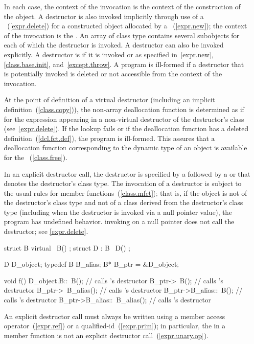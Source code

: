 %
%
In each case, the context of the invocation is the context of the construction of
the object. A destructor is also invoked implicitly through use of a
~(\ref{expr.delete}) for a constructed object allocated
by a ~(\ref{expr.new}); the context of the invocation is the
.
\enternote An array of class type contains several subobjects for each of which
the destructor is invoked. \exitnote
A destructor can also be invoked explicitly. A destructor is 
if it is invoked or as specified in~\ref{expr.new}, \ref{class.base.init},
and~\ref{except.throw}.
A program is ill-formed if a destructor that is potentially invoked is deleted
or not accessible from the context of the invocation.

\pnum
At the point of definition of a virtual destructor (including an implicit
definition~(\ref{class.copy})), the non-array deallocation function is 
determined as if for the expression  appearing in a
non-virtual destructor of the destructor's class (see~\ref{expr.delete}).
If the lookup fails or if the deallocation function has
a deleted definition~(\ref{dcl.fct.def}), the program is ill-formed.
\enternote
This assures that a deallocation function corresponding to the dynamic type of an
object is available for the
~(\ref{class.free}).
\exitnote

\pnum
{}%
In an explicit destructor call, the destructor is specified by a
\tcode{\~{}}
followed by a
 or 
that denotes the destructor's class type.
The invocation of a destructor is subject to the usual rules for member
functions~(\ref{class.mfct});
that is, if the object is not of the destructor's class type and
not of a class derived from the destructor's class type (including when
the destructor is invoked via a null pointer value), the program has
undefined behavior.
\enternote invoking  on a null pointer does not call the
destructor; see \ref{expr.delete}. \exitnote
\enterexample

\begin{codeblock}
struct B {
  virtual ~B() { }
};
struct D : B {
  ~D() { }
};

D D_object;
typedef B B_alias;
B* B_ptr = &D_object;

void f() {
  D_object.B::~B();             // calls 's destructor
  B_ptr->~B();                  // calls 's destructor
  B_ptr->~B_alias();            // calls 's destructor
  B_ptr->B_alias::~B();         // calls 's destructor
  B_ptr->B_alias::~B_alias();   // calls 's destructor
}
\end{codeblock}
\exitexample
\enternote
An explicit destructor call must always be written using
a member access operator~(\ref{expr.ref}) or a qualified-id~(\ref{expr.prim});
in particular, the
in a member function is not an explicit destructor call~(\ref{expr.unary.op}).
\exitnote

